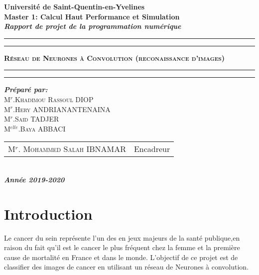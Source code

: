 \documentclass[a4paper,11pt]{report}
\begin{document}
\begin{center}
{\Large {\bf Université de Saint-Quentin-en-Yvelines}}\\
{\Large {\bf {Master 1: Calcul Haut Performance et Simulation }}}\\
 \textbf{{\Huge  \textit{Rapport de projet de la programmation numérique}}} \\
\hrule
\hrule
{}
{\Huge \textbf{\textsc{ Réseau de Neurones à Convolution (reconaissance d’images) }}}\\
\hrule
\hrule
{}
{\textbf{\textit {Préparé par:}}}\\
{\large\textsc{M$^{r}$.Khadimou Rassoul DIOP}}\\
{\large\textsc{M$^{r}$.Hery ANDRIANANTENAINA}}\\
{\large\textsc{M$^{r}$.Said TADJER }}\\
{\large\textsc{M$^{elle}$.Baya ABBACI}}\\
{\large
\begin{tabular}{ll}
M$^{r}$. \textsc{Mohammed Salah} IBNAMAR  & Encadreur    \\
\end{tabular}
}\\
{\Large\textbf{\textit{ Année 2019-2020}}}
\end{center}


\tableofcontents


\chapter*{Introduction}
Le cancer du sein représente l'un des en jeux majeurs de la santé publique,en raison du fait qu'il est le cancer le plus fréquent chez la femme et la première cause de mortalité en France et dans le monde. L'objectif de ce projet est de classifier des images de cancer en utilisant un réseau de Neurones à convolution.\\
\end{document}
